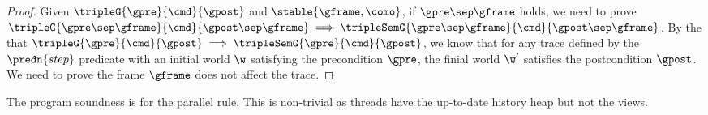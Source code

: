 \begin{proof}

Given \( \tripleG{\gpre}{\cmd}{\gpost} \) and \( \stable{\gframe, \como}\), if \( \gpre \sep \gframe \) holds, we need to prove \( \tripleG{\gpre \sep \gframe }{\cmd}{\gpost \sep \gframe } \implies \tripleSemG{\gpre \sep \gframe }{\cmd}{\gpost \sep \gframe }\).
By the \ih that  \( \tripleG{\gpre}{\cmd}{\gpost} \implies \tripleSemG{\gpre}{\cmd}{\gpost} \), we know that for any trace defined by the \( \predn{step} \) predicate with an initial world \( \w \) satisfying the precondition \( \gpre \), the finial world \( \w' \) satisfies the postcondition \( \gpost \).
We need to prove the frame \( \gframe \) does not affect the trace.

\end{proof}


The program soundness is for the parallel rule.
This is non-trivial as threads have the up-to-date history heap but not the views.
\begin{definition}[Judgement]
\[
\]
\end{definition}

